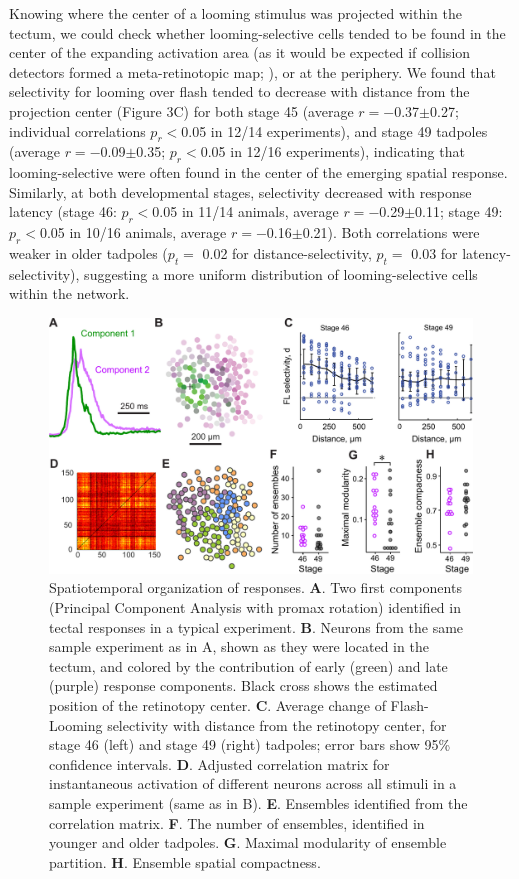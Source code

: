 \documentclass{article}
\begin{document}
Knowing where the center of a looming stimulus was projected within the tectum, we could check whether looming-selective cells tended to be found in the center of the expanding activation area (as it would be expected if collision detectors formed a meta-retinotopic map; \citealt{frost2004review}), or at the periphery. We found that selectivity for looming over flash tended to decrease with distance from the projection center (Figure 3C) for both stage 45 (average $r=-$0.37$\pm$0.27; individual correlations $p_r<$0.05 in 12/14 experiments), and stage 49 tadpoles (average $r=-$0.09$\pm$0.35; $p_r<$0.05 in 12/16 experiments), indicating that looming-selective were often found in the center of the emerging spatial response. Similarly, at both developmental stages, selectivity decreased with response latency (stage 46: $p_r<$0.05 in 11/14 animals, average $r=-$0.29$\pm$0.11; stage 49: $p_r<$0.05 in 10/16 animals, average $r=-$0.16$\pm$0.21). Both correlations were weaker in older tadpoles ($p_t=$ 0.02 for distance-selectivity, $p_t=$ 0.03 for latency-selectivity), suggesting a more uniform distribution of looming-selective cells within the network.

\begin{figure}[t!]
\includegraphics[width=\linewidth]{fig3.pdf}
\caption{
Spatiotemporal organization of responses. \textbf{A}. Two first components (Principal Component Analysis with promax rotation) identified in tectal responses in a typical experiment.  \textbf{B}. Neurons from the same sample experiment as in A, shown as they were located in the tectum, and colored by the contribution of early (green) and late (purple) response components. Black cross shows the estimated position of the retinotopy center. \textbf{C}. Average change of Flash-Looming selectivity with distance from the retinotopy center, for stage 46 (left) and stage 49 (right) tadpoles; error bars show 95\% confidence intervals. \textbf{D}. Adjusted correlation matrix for instantaneous activation of different neurons across all stimuli in a sample experiment (same as in B). \textbf{E}. Ensembles identified from the correlation matrix. \textbf{F}. The number of ensembles, identified in younger and older tadpoles. \textbf{G}. Maximal modularity of ensemble partition. \textbf{H}. Ensemble spatial compactness.}
\end{figure}
\end{document}
